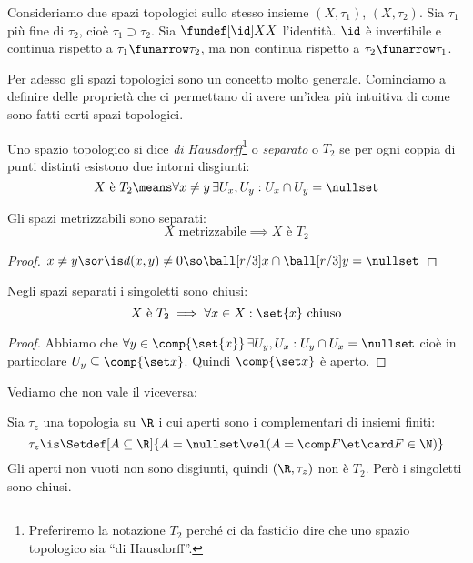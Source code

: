 \begin{es}
	Consideriamo due spazi topologici sullo stesso insieme $(X,\tau_1)$, $(X,\tau_2)$.
	Sia $\tau_1$ più fine di $\tau_2$, cioè $\tau_1\supset\tau_2$.
	Sia $\fundef[\id]XX$ l'identità.
	$\id$ è invertibile e continua rispetto a $\tau_1\funarrow\tau_2$,
	ma non continua rispetto a $\tau_2\funarrow\tau_1$.
\end{es}


Per adesso gli spazi topologici sono un concetto molto generale. Cominciamo a definire delle proprietà che ci permettano di avere un'idea più intuitiva di come sono fatti certi spazi topologici.

\begin{defn}
	Uno spazio topologico si dice \emph{di Hausdorff}\footnote{Preferiremo la notazione $T_2$ perché ci da fastidio dire che uno spazio topologico sia ``di Hausdorff''.} o \emph{separato} o \emph{$T_2$} se per ogni coppia di punti distinti esistono due intorni disgiunti:
	\[X\text{ è }T_2\means
	\forall x\neq y\,\exists U_x,U_y:U_x\cap U_y=\nullset\]
\end{defn}

\begin{prop}
	Gli spazi metrizzabili sono separati:
	\[X\text{ metrizzabile}\implies X\text{ è }T_2\]
\end{prop}

\begin{proof}
	$x\neq y\so r\is d(x,y)\neq 0\so\ball[r/3]x\cap\ball[r/3]y=\nullset$
\end{proof}

\begin{prop}
	Negli spazi separati i singoletti sono chiusi:
	\[X\text{ è }T_2\implies\forall x\in X:\set{x}\text{ chiuso}\]
\end{prop}

\begin{proof}
	Abbiamo che $\forall y\in\comp{\set{x}}\,\exists U_y,U_x:U_y\cap U_x=\nullset$
	cioè in particolare $U_y\subseteq\comp{\set x}$.
	Quindi $\comp{\set x}$ è aperto.
\end{proof}

Vediamo che non vale il viceversa:

\begin{es}
	Sia $\tau_z$ una topologia su $\R$ i cui aperti sono i complementari di insiemi finiti:
	\[\tau_z\is\Setdef[A\subseteq\R]{A=\nullset\vel(A=\comp F\et\card F\in\N)}\]
	Gli aperti non vuoti non sono disgiunti, quindi $(\R,\tau_z)$ non è $T_2$.
	Però i singoletti sono chiusi.
\end{es}

